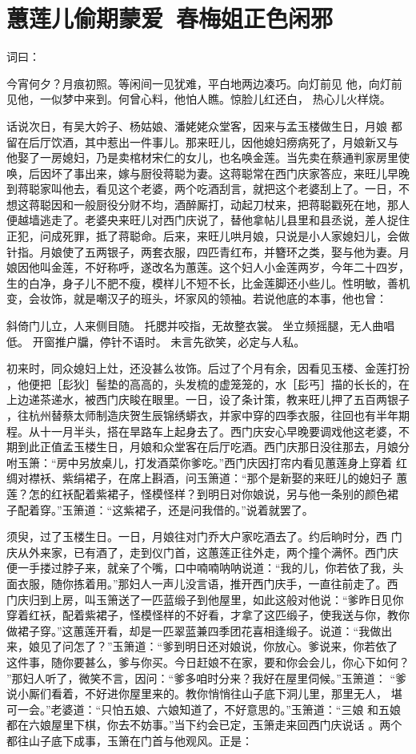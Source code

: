 \chapter{蕙莲儿偷期蒙爱~春梅姐正色闲邪}

词曰：

今宵何夕？月痕初照。等闲间一见犹难，平白地两边凑巧。向灯前见
他，向灯前见他，一似梦中来到。何曾心料，他怕人瞧。惊脸儿红还白，
热心儿火样烧。

话说次日，有吴大妗子、杨姑娘、潘姥姥众堂客，因来与孟玉楼做生日，月娘
都留在后厅饮酒，其中惹出一件事儿。那来旺儿，因他媳妇痨病死了，月娘新又与
他娶了一房媳妇，乃是卖棺材宋仁的女儿，也名唤金莲。当先卖在蔡通判家房里使
唤，后因坏了事出来，嫁与厨役蒋聪为妻。这蒋聪常在西门庆家答应，来旺儿早晚
到蒋聪家叫他去，看见这个老婆，两个吃酒刮言，就把这个老婆刮上了。一日，不
想这蒋聪因和一般厨役分财不均，酒醉厮打，动起刀杖来，把蒋聪戳死在地，那人
便越墙逃走了。老婆央来旺儿对西门庆说了，替他拿帖儿县里和县丞说，差人捉住
正犯，问成死罪，抵了蒋聪命。后来，来旺儿哄月娘，只说是小人家媳妇儿，会做
针指。月娘使了五两银子，两套衣服，四匹青红布，并簪环之类，娶与他为妻。月
娘因他叫金莲，不好称呼，遂改名为蕙莲。这个妇人小金莲两岁，今年二十四岁，
生的白净，身子儿不肥不瘦，模样儿不短不长，比金莲脚还小些儿。性明敏，善机
变，会妆饰，就是嘲汉子的班头，坏家风的领袖。若说他底的本事，他也曾：

斜倚门儿立，人来侧目随。
托腮并咬指，无故整衣裳。
坐立频摇腿，无人曲唱低。
开窗推户牖，停针不语时。
未言先欲笑，必定与人私。

初来时，同众媳妇上灶，还没甚么妆饰。后过了个月有余，因看见玉楼、金莲打扮
，他便把［髟狄］髻垫的高高的，头发梳的虚笼笼的，水［髟丐］描的长长的，在
上边递茶递水，被西门庆睃在眼里。一日，设了条计策，教来旺儿押了五百两银子
，往杭州替蔡太师制造庆贺生辰锦绣蟒衣，并家中穿的四季衣服，往回也有半年期
程。从十一月半头，搭在旱路车上起身去了。西门庆安心早晚要调戏他这老婆，不
期到此正值孟玉楼生日，月娘和众堂客在后厅吃酒。西门庆那日没往那去，月娘分
咐玉箫：“房中另放桌儿，打发酒菜你爹吃。”西门庆因打帘内看见蕙莲身上穿着
红绸对襟袄、紫绢裙子，在席上斟酒，问玉箫道：“那个是新娶的来旺儿的媳妇子
蕙莲？怎的红袄配着紫裙子，怪模怪样？到明日对你娘说，另与他一条别的颜色裙
子配着穿。”玉箫道：“这紫裙子，还是问我借的。”说着就罢了。

须臾，过了玉楼生日。一日，月娘往对门乔大户家吃酒去了。约后晌时分，西
门庆从外来家，已有酒了，走到仪门首，这蕙莲正往外走，两个撞个满怀。西门庆
便一手搂过脖子来，就亲了个嘴，口中喃喃呐呐说道：“我的儿，你若依了我，头
面衣服，随你拣着用。”那妇人一声儿没言语，推开西门庆手，一直往前走了。西
门庆归到上房，叫玉箫送了一匹蓝缎子到他屋里，如此这般对他说：“爹昨日见你
穿着红袄，配着紫裙子，怪模怪样的不好看，才拿了这匹缎子，使我送与你，教你
做裙子穿。”这蕙莲开看，却是一匹翠蓝兼四季团花喜相逢缎子。说道：“我做出
来，娘见了问怎了？”玉箫道：“爹到明日还对娘说，你放心。爹说来，你若依了
这件事，随你要甚么，爹与你买。今日赶娘不在家，要和你会会儿，你心下如何？
”那妇人听了，微笑不言，因问：“爹多咱时分来？我好在屋里伺候。”玉箫道：
“爹说小厮们看着，不好进你屋里来的。教你悄悄往山子底下洞儿里，那里无人，
堪可一会。”老婆道：“只怕五娘、六娘知道了，不好意思的。”玉箫道：“三娘
和五娘都在六娘屋里下棋，你去不妨事。”当下约会已定，玉箫走来回西门庆说话
。两个都往山子底下成事，玉箫在门首与他观风。正是：

